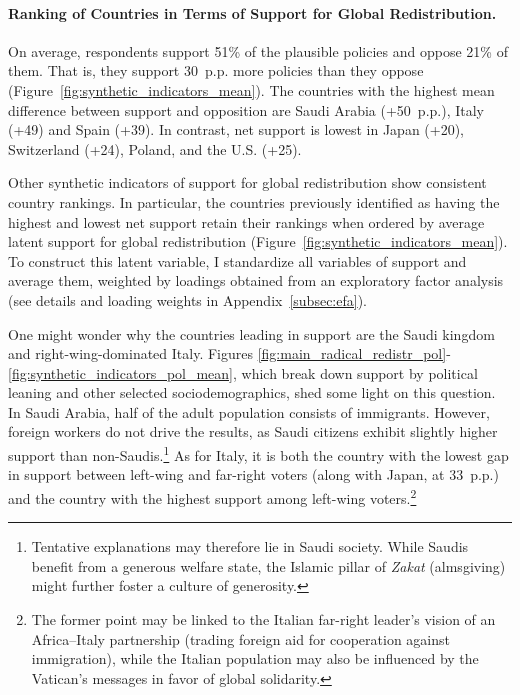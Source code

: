 \documentclass[12pt,english]{article}
\begin{document}
\paragraph{Ranking of Countries in Terms of Support for Global Redistribution.}\label{par:ranking}

On average, respondents support 51\% of the plausible policies and oppose 21\% of them. That is, they support 30~p.p. more policies than they oppose (Figure~\ref{fig:synthetic_indicators_mean}). The countries with the highest mean difference between support and opposition are Saudi Arabia (+50~p.p.), Italy (+49) and Spain (+39). In contrast, net support is lowest in Japan (+20), Switzerland (+24), Poland, and the U.S. (+25). %

Other synthetic indicators of support for global redistribution show consistent country rankings. In particular, the countries previously identified as having the highest and lowest net support retain their rankings when ordered by average latent support for global redistribution (Figure~\ref{fig:synthetic_indicators_mean}). 
To construct this latent variable, I standardize all variables of support and average them, weighted by loadings obtained from an exploratory factor analysis (see details and loading weights in Appendix~\ref{subsec:efa}). 

One might wonder why the countries leading in support are the Saudi kingdom and right-wing-dominated Italy. Figures \ref{fig:main_radical_redistr_pol}-\ref{fig:synthetic_indicators_pol_mean}, which break down support by political leaning and other selected sociodemographics, shed some light on this question. In Saudi Arabia, half of the adult population consists of immigrants. %
However, foreign workers do not drive the results, as Saudi citizens exhibit slightly higher support than non-Saudis.\footnote{Tentative explanations may therefore lie in Saudi society. While Saudis benefit from a generous welfare state, the Islamic pillar of \textit{Zakat} (almsgiving) might further foster a culture of generosity.} 
As for Italy, it is both the country with the lowest gap in support between left-wing and far-right voters (along with Japan, at 33~p.p.) and the country with the highest support among left-wing voters.\footnote{The former point may be linked to the Italian far-right leader's vision of an Africa--Italy partnership (trading foreign aid for cooperation against immigration), while the Italian population may also be influenced by the Vatican's messages in favor of global solidarity.} 
\end{document}
